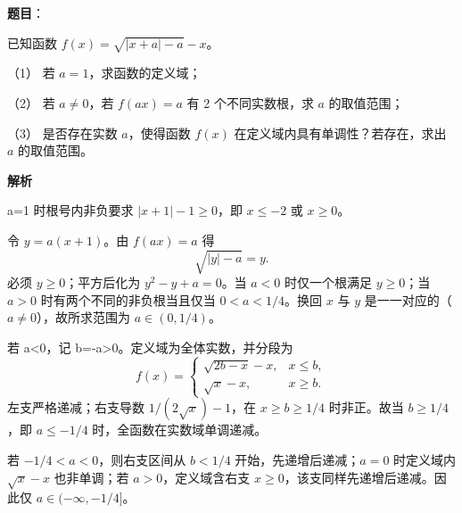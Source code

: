 \begin{answer}

\textbf{题目}：

已知函数 $f(x)=\sqrt{|x+a|-a}-x$。

（1） 若 $a=1$，求函数的定义域；

（2） 若 $a\ne0$，若 $f(ax)=a$ 有 2 个不同实数根，求 $a$ 的取值范围；

（3） 是否存在实数 $a$，使得函数 $f(x)$ 在定义域内具有单调性？若存在，求出 $a$ 的取值范围。

\textbf{解析}


a=1 时根号内非负要求 \(|x+1|-1\ge0\)，即 \(x\le-2\) 或 \(x\ge0\)。


令 \(y=a(x+1)\)。由 \(f(ax)=a\) 得
\nopagebreak[4]
\[
\sqrt{|y|-a}=y.
\]
必须 $y\ge0$；平方后化为 \(y^2-y+a=0\)。当 $a<0$ 时仅一个根满足 $y\ge0$；当 $a>0$ 时有两个不同的非负根当且仅当 \(0<a<1/4\)。换回 $x$ 与 $y$ 是一一对应的（$a\ne0$），故所求范围为 \(a\in(0,1/4)\)。


若 a<0，记 b=-a>0。定义域为全体实数，并分段为
\nopagebreak[4]
\[
f(x)=
\begin{cases}
\sqrt{2b-x}-x,&x\le b,\\
\sqrt x-x,&x\ge b.
\end{cases}
\]
左支严格递减；右支导数 \(1/(2\sqrt x)-1\)，在 $x\ge b\ge1/4$ 时非正。故当 $b\ge1/4$，即 $a\le-1/4$ 时，全函数在实数域单调递减。

若 $-1/4<a<0$，则右支区间从 $b<1/4$ 开始，先递增后递减；$a=0$ 时定义域内 \(\sqrt x-x\) 也非单调；若 $a>0$，定义域含右支 $x\ge0$，该支同样先递增后递减。因此仅 \(a\in(-\infty,-1/4]\)。

\gkanswer{答案（1）：$(-\infty,-2]\cup[0,+\infty)$}


\gkanswer{答案（3）：$a\in(-\infty,-\dfrac14]$}

\end{answer}

